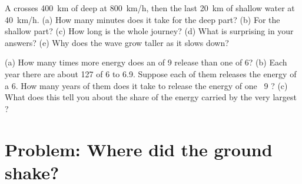 \begin{exercise}[$\star\star\star$]\label{exo:g7:earthquakes:11}
A  crosses \qty{400}{km} of deep  at \qty{800}{km/h}, then
the last \qty{20}{km} of shallow water at \qty{40}{km/h}. (a) How many
minutes does it take for the deep part? (b) For the shallow part? (c) How
long is the whole journey? (d) What is surprising in your answers? (e)
Why does the wave grow taller as it slows down?
\end{exercise}

\begin{exercise}[$\star\star\star$]\label{exo:g7:earthquakes:12}
(a) How many times more energy does an  of  9 release
than one of  6? (b) Each year there are about 127  of
 6 to 6.9. Suppose each of them releases the energy of a
 6. How many years of them does it take to release the energy of
one ~9 ? (c) What does this tell you about the share
of the energy carried by the very largest ?
\end{exercise}

\section{Problem: Where did the ground shake?}

